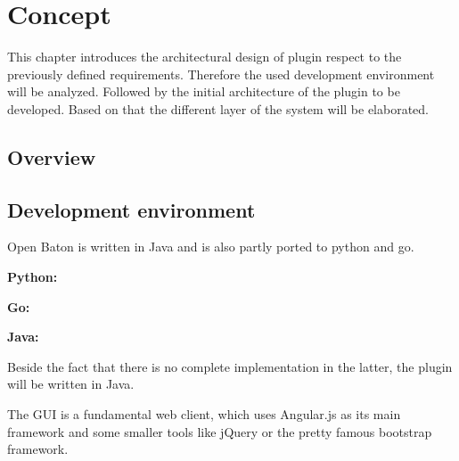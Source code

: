 \acresetall

\chapter{Concept}\label{chapter:concept}
This chapter introduces the architectural design of plugin respect to the previously defined requirements.
Therefore the used development environment will be analyzed.
Followed by the initial architecture of the plugin to be developed.
Based on that the different layer of the system will be elaborated.

\section{Overview}
\doit


\section{Development environment}
\doit

Open Baton is written in Java and is also partly ported to python and go.

\textbf{Python:}

\textbf{Go:}

\textbf{Java:}

Beside the fact that there is no complete implementation in the latter, the plugin will be written in Java.

The \ac{GUI} is a fundamental web client, which uses Angular.js as its main framework and some smaller tools like jQuery or the pretty famous bootstrap framework.



